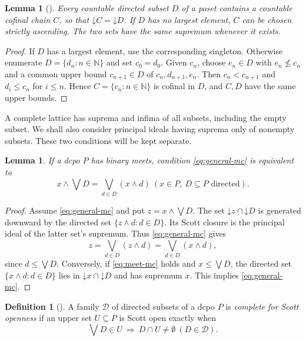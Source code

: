 \documentclass[11pt,reqno]{amsart}
\newtheorem{lemma}[theorem]{Lemma}
\theoremstyle{definition}
\newtheorem{definition}[theorem]{Definition}
\theoremstyle{remark}
\numberwithin{equation}{section}
\newcommand{\N}{\mathbb N}
\newcommand{\down}[1]{\mathord{\downarrow}#1}
\newcommand{\mc}{\wedge}
\begin{document}
\begin{lemma}[{\cite[Lemma~1]{LawsonXuLower}}]\label{lem:cofinal-chain}
Every countable directed subset $D$ of a poset contains a countable cofinal chain $C$, so that $\down C=\down D$. If $D$ has no largest element, $C$ can be chosen strictly ascending. The two sets have the same supremum whenever it exists.
\end{lemma}
\begin{proof}
If $D$ has a largest element, use the corresponding singleton. Otherwise enumerate $D=\{d_n:n\in\N\}$ and set $c_0=d_0$. Given $c_n$, choose $e_n\in D$ with $e_n\nleq c_n$ and a common upper bound $c_{n+1}\in D$ of $c_n,d_{n+1},e_n$. Then $c_n<c_{n+1}$ and $d_i\le c_n$ for $i\le n$. Hence $C=\{c_n:n\in\N\}$ is cofinal in $D$, and $C,D$ have the same upper bounds.
\end{proof}

A complete lattice has suprema and infima of all subsets, including the empty subset. We shall also consider principal ideals having suprema only of nonempty subsets. These two conditions will be kept separate.

\begin{lemma}\label{lem:meet-mc}
If a dcpo $P$ has binary meets, condition \eqref{eq:general-mc} is equivalent to
\begin{equation}\label{eq:meet-mc}
 x\mc\bigvee D=\bigvee_{d\in D}(x\mc d)
 ~(x\in P,\ D\subseteq P\text{ directed}).
\end{equation}
\end{lemma}
\begin{proof}
Assume \eqref{eq:general-mc} and put $z=x\mc\bigvee D$. The set $\down z\cap\down D$ is generated downward by the directed set $\{z\mc d:d\in D\}$. Its Scott closure is the principal ideal of the latter set's supremum. Thus \eqref{eq:general-mc} gives
\[
 z=\bigvee_{d\in D}(z\mc d)=\bigvee_{d\in D}(x\mc d),
\]
since $d\le\bigvee D$. Conversely, if \eqref{eq:meet-mc} holds and $x\le\bigvee D$, the directed set $\{x\mc d:d\in D\}$ lies in $\down x\cap\down D$ and has supremum $x$. This implies \eqref{eq:general-mc}.
\end{proof}

\begin{definition}[{\cite[Section~4]{XuJi}}]\label{def:complete-tests}
A family $\mathcal D$ of directed subsets of a dcpo $P$ is \emph{complete for Scott openness} if an upper set $U\subseteq P$ is Scott open exactly when
\[
 \bigvee D\in U~\Longrightarrow~ D\cap U\ne\emptyset
 ~(D\in\mathcal D).
\]
\end{definition}
\end{document}
